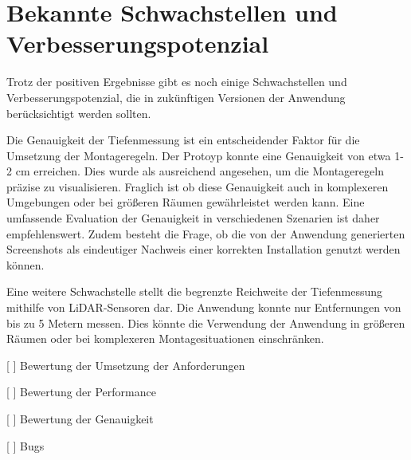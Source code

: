 \section{Bekannte Schwachstellen und Verbesserungspotenzial}

Trotz der positiven Ergebnisse gibt es noch einige Schwachstellen und Verbesserungspotenzial, die in zukünftigen Versionen der Anwendung berücksichtigt werden sollten.

Die Genauigkeit der Tiefenmessung ist ein entscheidender Faktor für die Umsetzung der Montageregeln. Der Protoyp konnte eine Genauigkeit von etwa 1-2 cm erreichen. Dies wurde als ausreichend angesehen, um die Montageregeln präzise zu visualisieren. Fraglich ist ob diese Genauigkeit auch in komplexeren Umgebungen oder bei größeren Räumen gewährleistet werden kann. Eine umfassende Evaluation der Genauigkeit in verschiedenen Szenarien ist daher empfehlenswert. Zudem besteht die Frage, ob die von der Anwendung generierten Screenshots als eindeutiger Nachweis einer korrekten Installation genutzt werden können.

Eine weitere Schwachstelle stellt die begrenzte Reichweite der Tiefenmessung mithilfe von LiDAR-Sensoren dar. Die Anwendung konnte nur Entfernungen von bis zu 5 Metern messen. Dies könnte die Verwendung der Anwendung in größeren Räumen oder bei komplexeren Montagesituationen einschränken. 



[ ] Bewertung der Umsetzung der Anforderungen

[ ] Bewertung der Performance

[ ] Bewertung der Genauigkeit

[ ] Bugs